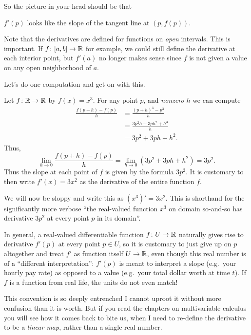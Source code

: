 So the picture in your head should be that
\begin{moral}
	$f'(p)$ looks like the slope of the tangent line at $(p, f(p))$.
\end{moral}

\begin{remark}
	Note that the derivatives are defined
	for functions on \emph{open} intervals.
	This is important.
	If $f \colon [a,b] \to \mathbb R$ for example,
	we could still define the derivative at each interior point,
	but $f'(a)$ no longer makes sense
	since $f$ is not given a value on any open neighborhood of $a$.
\end{remark}

Let's do one computation and get on with this.
\begin{example}
	[Derivative of $x^3$ is $3x^2$]
	Let $f \colon \mathbb R \to \mathbb R$ by $f(x) = x^3$.
	For any point $p$, and \emph{nonzero} $h$ we can compute
	\begin{align*}
		\frac{f(p+h) - f(p)}{h} &= \frac{(p+h)^3 - p^3}{h} \\
		&= \frac{3p^2h + 3ph^2 + h^3}{h} \\
		&= 3p^2 + 3ph + h^2.
	\end{align*}
	Thus,
	\[ \lim_{h \to 0} \frac{f(p+h)-f(p)}{h}
		= \lim_{h \to 0} (3p^2+3ph+h^2) = 3p^2. \]
	Thus the slope at each point of $f$ is given by the formula $3p^2$.
	It is customary to then write $f'(x) = 3x^2$
	as the derivative of the entire function $f$.
\end{example}
\begin{abuse}
	We will now be sloppy and write this as $(x^3)' = 3x^2$.
	This is shorthand for the significantly more verbose
	``the real-valued function $x^3$ on domain so-and-so
	has derivative $3p^2$ at every point $p$ in its domain''.

	In general, a real-valued differentiable function
	$f \colon U \to \mathbb R$ naturally gives rise to derivative
	$f'(p)$ at every point $p \in U$,
	so it is customary to just give up on $p$ altogether
	and treat $f'$ as function itself $U \to \mathbb R$,
	even though this real number is of a ``different interpretation'':
	$f'(p)$ is meant to interpret a slope (e.g.\ your hourly pay rate)
	as opposed to a value (e.g.\ your total dollar worth at time $t$).
	If $f$ is a function from real life, the units do not even match!

	This convention is so deeply entrenched I cannot uproot it
	without more confusion than it is worth.
	But if you read the chapters on multivariable calculus
	you will see how it comes back to bite us,
	when I need to re-define the derivative to be a \emph{linear map},
	rather than a single real number.
\end{abuse}

